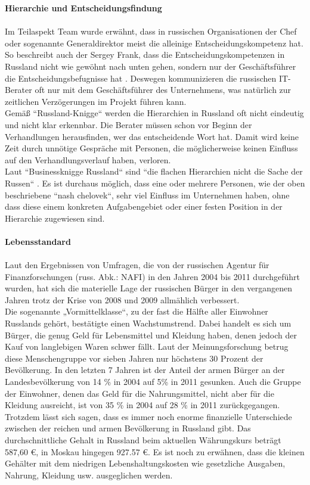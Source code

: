 	 	 \textbf{Hierarchie und Entscheidungsfindung}\\
	 	 \\
	 Im Teilaspekt Team wurde erwähnt, dass in russischen Organisationen der Chef oder sogenannte Generaldirektor meist die alleinige Entscheidungskompetenz hat. So beschreibt auch der Sergey Frank, dass die Entscheidungskompetenzen in Russland nicht wie gewöhnt nach unten gehen, sondern nur der Geschäftsführer die Entscheidungsbefugnisse hat \cite{RuSFI}.
	 Deswegen kommunizieren die russischen IT-Berater oft nur mit dem Geschäftsführer des Unternehmens, was natürlich zur zeitlichen Verzögerungen im Projekt führen kann.\\
	 Gemäß ``Russland-Knigge`` \cite{RusKnigge} werden die Hierarchien in Russland oft  nicht eindeutig und nicht klar erkennbar. Die Berater müssen schon vor Beginn der Verhandlungen herausfinden, wer das entscheidende Wort hat. Damit wird keine Zeit durch unnötige Gespräche mit Personen, die möglicherweise keinen Einfluss auf den Verhandlungsverlauf haben, verloren.\\
	 Laut ``Businessknigge Russland`` sind ``die flachen Hierarchien nicht die Sache der Russen`` \cite{RusKnigge}. Es ist durchaus möglich, dass eine oder mehrere Personen, wie der oben beschriebene  ``nash chelovek``,  sehr viel Einfluss im Unternehmen haben, ohne dass diese einem konkreten Aufgabengebiet oder einer festen Position in der Hierarchie zugewiesen sind.\\ \\
		 	 \textbf{Lebensstandard}\\ \\
	Laut den Ergebnissen von Umfragen, die von der russischen Agentur für Finanzforschungen (russ. Abk.: NAFI) in den Jahren 2004 bis 2011 durchgeführt wurden, hat sich die materielle Lage der russischen Bürger in den vergangenen  Jahren trotz der Krise von 2008 und 2009 allmählich verbessert. \cite{LBSRu}\\
	 Die sogenannte „Vormittelklasse“, zu der fast die Hälfte aller Einwohner Russlands gehört, bestätigte einen Wachstumstrend. Dabei handelt es sich um Bürger, die genug Geld für Lebensmittel und Kleidung haben, denen jedoch der Kauf von langlebigen Waren schwer fällt. Laut der Meinungsforschung betrug diese Menschengruppe vor sieben Jahren nur höchstens 30 Prozent der Bevölkerung. In den letzten 7 Jahren ist der Anteil der armen Bürger an der Landesbevölkerung von 14 \% in 2004 auf 5\% in 2011 gesunken. Auch die Gruppe der Einwohner, denen das Geld für die Nahrungsmittel, nicht aber für die Kleidung ausreicht, ist von 35 \% in 2004 auf 28 \% in 2011 zurückgegangen. \cite{LBSRu} \\
	 Trotzdem lässt sich sagen, dass es immer noch enorme finanzielle Unterschiede zwischen der reichen und armen Bevölkerung in Russland gibt. Das durchschnittliche Gehalt in Russland beim aktuellen Währungskurs beträgt 587,60 €, in Moskau hingegen 927.57 €. Es ist noch zu erwähnen, dass die kleinen Gehälter mit dem niedrigen Lebenshaltungskosten wie gesetzliche Ausgaben, Nahrung, Kleidung usw. ausgeglichen werden. 
